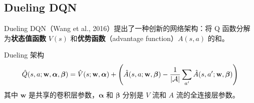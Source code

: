 \subsection{Dueling DQN}

Dueling DQN（Wang et al., 2016）提出了一种创新的网络架构：将 Q 函数分解为\textbf{状态值函数} $V(s)$ 和\textbf{优势函数}（advantage function）$A(s,a)$ 的和。

\begin{mydefinition}{Dueling 架构}
$$\hat{Q}(s, a; \mathbf{w}, \boldsymbol{\alpha}, \boldsymbol{\beta}) = \hat{V}(s; \mathbf{w}, \boldsymbol{\alpha}) + \left( \hat{A}(s, a; \mathbf{w}, \boldsymbol{\beta}) - \frac{1}{|\mathcal{A}|}\sum_{a'} \hat{A}(s, a'; \mathbf{w}, \boldsymbol{\beta}) \right)$$
其中 $\mathbf{w}$ 是共享的卷积层参数，$\boldsymbol{\alpha}$ 和 $\boldsymbol{\beta}$ 分别是 $V$ 流和 $A$ 流的全连接层参数。
\end{mydefinition}

